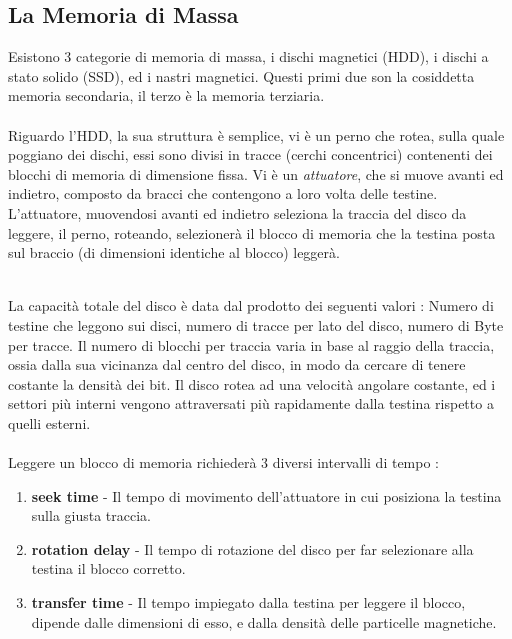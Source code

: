 \documentclass[12pt, letterpaper]{article}
\newcommand{\acc}{\\\hphantom{}\\}
\begin{document}
\subsection{La Memoria di Massa}
Esistono 3 categorie di memoria di massa, i dischi magnetici (HDD), i dischi a stato solido (SSD), ed i nastri magnetici. 
Questi primi due son la cosiddetta memoria secondaria, il terzo è la memoria terziaria.\acc

Riguardo l'HDD, la sua struttura è semplice, vi è un perno che rotea, sulla quale poggiano dei dischi, essi sono divisi in tracce (cerchi 
concentrici) contenenti dei blocchi di memoria di dimensione fissa. Vi è un \textit{attuatore}, che si muove avanti ed indietro, 
composto da bracci che contengono a loro volta delle testine. L'attuatore, muovendosi avanti ed indietro seleziona la traccia del 
disco da leggere, il perno, roteando, selezionerà il blocco di memoria che la testina posta sul braccio (di dimensioni 
identiche al blocco) leggerà.
\begin{figure}[h]
\end{figure}\\
La capacità totale del disco è data dal prodotto dei seguenti valori : Numero di testine che leggono sui disci, 
numero di tracce per lato del disco, numero di Byte per tracce. Il numero di blocchi per traccia varia in base al 
raggio della traccia, ossia dalla sua vicinanza dal centro del disco, in modo da cercare di tenere costante la 
densità dei bit. Il disco rotea ad una velocità angolare costante, ed i settori più interni vengono attraversati 
più rapidamente dalla testina rispetto a quelli esterni.\acc Leggere un blocco di memoria richiederà 3 diversi intervalli di tempo :\begin{enumerate}
    \item \textbf{seek time }- Il tempo di movimento dell'attuatore in cui posiziona la testina sulla giusta traccia.
    \item \textbf{rotation delay} - Il tempo di rotazione del disco per far selezionare alla testina il blocco corretto.
    \item \textbf{transfer time} - Il tempo impiegato dalla testina per leggere il blocco, dipende dalle dimensioni di esso, 
    e dalla densità delle particelle magnetiche.
\end{enumerate}
\end{document}

